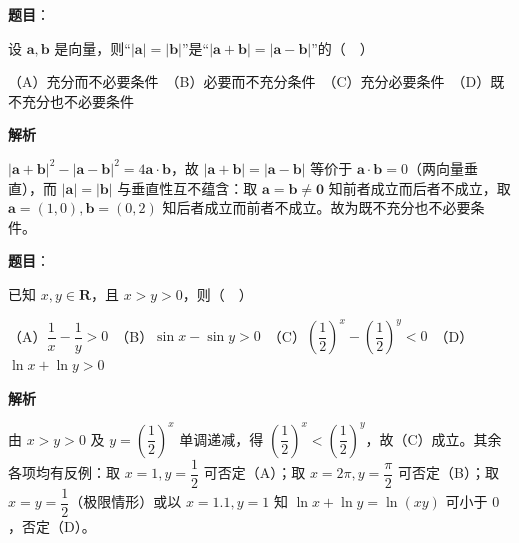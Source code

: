 \begin{answer}

\textbf{题目}：

设 \(\boldsymbol{a},\boldsymbol{b}\) 是向量，则“\(|\boldsymbol{a}|=|\boldsymbol{b}|\)”是“\(|\boldsymbol{a}+\boldsymbol{b}|=|\boldsymbol{a}-\boldsymbol{b}|\)”的（　）

（A）充分而不必要条件　（B）必要而不充分条件　（C）充分必要条件　（D）既不充分也不必要条件

\textbf{解析}

\(|\boldsymbol a+\boldsymbol b|^2-|\boldsymbol a-\boldsymbol b|^2=4\boldsymbol a\cdot\boldsymbol b\)，故 \(|\boldsymbol a+\boldsymbol b|=|\boldsymbol a-\boldsymbol b|\) 等价于 \(\boldsymbol a\cdot\boldsymbol b=0\)（两向量垂直），而 \(|\boldsymbol a|=|\boldsymbol b|\) 与垂直性互不蕴含：取 \(\boldsymbol a=\boldsymbol b\neq\boldsymbol 0\) 知前者成立而后者不成立，取 \(\boldsymbol a=(1,0),\boldsymbol b=(0,2)\) 知后者成立而前者不成立。故为既不充分也不必要条件。


\end{answer}
\begin{answer}

\textbf{题目}：

已知 \(x,y\in\mathbf{R}\)，且 \(x>y>0\)，则（　）

（A）\(\dfrac{1}{x}-\dfrac{1}{y}>0\)　（B）\(\sin x-\sin y>0\)　（C）\(\left(\dfrac{1}{2}\right)^{x}-\left(\dfrac{1}{2}\right)^{y}<0\)　（D）\(\ln x+\ln y>0\)

\textbf{解析}

由 \(x>y>0\) 及 \(y=\left(\dfrac12\right)^x\) 单调递减，得 \(\left(\dfrac12\right)^x<\left(\dfrac12\right)^y\)，故（C）成立。其余各项均有反例：取 \(x=1,y=\dfrac12\) 可否定（A）；取 \(x=2\pi,y=\dfrac{\pi}{2}\) 可否定（B）；取 \(x=y=\dfrac12\)（极限情形）或以 \(x=1.1,y=1\) 知 \(\ln x+\ln y=\ln(xy)\) 可小于 \(0\)，否定（D）。


\end{answer}
